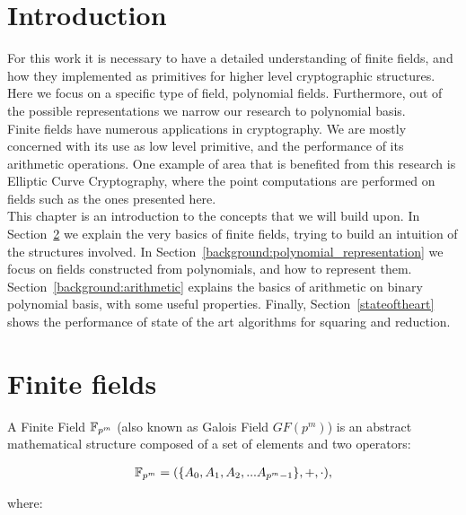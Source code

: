 \section{Introduction}

For this work it is necessary to have a detailed understanding of finite fields, and how they implemented as primitives for higher level cryptographic structures. Here we focus on a specific type of field, polynomial fields. Furthermore, out of the possible representations we narrow our research to polynomial basis. \\

Finite fields have numerous applications in cryptography. We are mostly concerned with its use as low level primitive, and the performance of its arithmetic operations. One example of area that is benefited from this research is Elliptic Curve Cryptography, where the point computations are performed on fields such as the ones presented here. \\

This chapter is an introduction to the concepts that we will build upon. In Section~\ref{background:finite_fields} we explain the very basics of finite fields, trying to build an intuition of the structures involved. In Section~\ref{background:polynomial_representation} we focus on fields constructed from polynomials, and how to represent them. Section~\ref{background:arithmetic} explains the basics of arithmetic on binary polynomial basis, with some useful properties. Finally, Section~\ref{stateoftheart} shows the performance of state of the art algorithms for squaring and reduction. \\

\section{Finite fields} \label{background:finite_fields}

A Finite Field $\mathbb{F}_{p^m}$ (also known as Galois Field $GF(p^m)$) is an abstract mathematical structure composed of a set of elements and two operators: 

\begin{gather*}
\mathbb{F}_{p^m} = (\{A_0, A_1, A_2, ... A_{p^m-1}\}, +, \cdot),
\end{gather*}

where:

